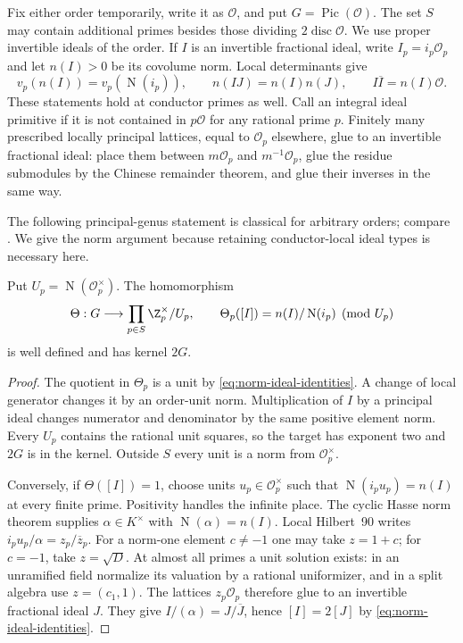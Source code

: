 Fix either order temporarily, write it as \(\mathcal O\), and put
\(G=\operatorname{Pic}(\mathcal O)\). The set \(S\) may contain
additional primes besides those dividing \(2\operatorname{disc}\mathcal O\).
We use proper invertible ideals of the order.  If $I$ is an invertible
fractional ideal, write $I_p=i_p\mathcal O_p$ and let $n(I)>0$ be its
covolume norm.  Local determinants give
\begin{equation}\label{eq:norm-ideal-identities}
 v_p(n(I))=v_p(\operatorname N(i_p)),\qquad
 n(IJ)=n(I)n(J),\qquad I\overline I=n(I)\mathcal O.
\end{equation}
These statements hold at conductor primes as well.  Call an integral
ideal primitive if it is not contained in $p\mathcal O$ for any rational
prime $p$.  Finitely many prescribed locally principal lattices, equal
to $\mathcal O_p$ elsewhere, glue to an invertible fractional ideal:
place them between $m\mathcal O_p$ and $m^{-1}\mathcal O_p$, glue the
residue submodules by the Chinese remainder theorem, and glue their
inverses in the same way.

The following principal-genus statement is classical for arbitrary
orders; compare \cite[Appendix~A, Proposition~A.1]{khayutin}.  We give
the norm argument because retaining conductor-local ideal types is
necessary here.

\begin{lemma}\label{lem:norm-genus}
Put $U_p=\operatorname N(\mathcal O_p^\times)$.  The homomorphism
\[
 \Theta:G\longrightarrow
       \prod_{p\in S}\Z_p^\times/U_p,\qquad
 \Theta_p([I])=n(I)/\operatorname N(i_p)\pmod{U_p}
\]
is well defined and has kernel $2G$.
\end{lemma}

\begin{proof}
The quotient in $\Theta_p$ is a unit by
\eqref{eq:norm-ideal-identities}.  A change of local generator changes
it by an order-unit norm.  Multiplication of $I$ by a principal ideal
changes numerator and denominator by the same positive element norm.
Every $U_p$ contains the rational unit squares, so the target has
exponent two and $2G$ is in the kernel.  Outside $S$ every unit is a
norm from $\mathcal O_p^\times$.

Conversely, if $\Theta([I])=1$, choose units $u_p\in\mathcal O_p^\times$
such that $\operatorname N(i_pu_p)=n(I)$ at every finite prime.
Positivity handles the infinite place.  The cyclic Hasse norm theorem
\cite[Chapter~VIII, Theorem~3.1]{milnecft} supplies $\alpha\in K^\times$
with $\operatorname N(\alpha)=n(I)$.  Local Hilbert~90 writes
$i_pu_p/\alpha=z_p/\overline z_p$.  For a norm-one element $c\ne-1$
one may take $z=1+c$; for $c=-1$, take $z=\sqrt D$.  At almost all
primes a unit solution exists: in an unramified field normalize its
valuation by a rational uniformizer, and in a split algebra use
$z=(c_1,1)$.  The lattices $z_p\mathcal O_p$ therefore glue to an
invertible fractional ideal $J$.  They give
$I/(\alpha)=J/\overline J$, hence $[I]=2[J]$ by
\eqref{eq:norm-ideal-identities}.

\end{proof}

